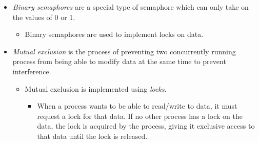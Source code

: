 \documentclass{article}
\begin{document}
\begin{itemize}
\begin{itemize}
\begin{itemize}
		\end{itemize}
		\item \texttt{down(s)}
		\begin{itemize}
			\item If $\mathtt{s} > 0$, the \texttt{s} is decremented, otherwise, the process calling \texttt{down(s)} is blocked.
		\end{itemize}
	\end{itemize}
	\item \emph{Binary semaphores} are a special type of semaphore which can only take on the values of 0 or 1.
	\begin{itemize}
		\item Binary semaphores are used to implement locks on data.
	\end{itemize}

	\item \emph{Mutual exclusion} is the process of preventing two concurrently running process from being able to modify data at the same time to prevent interference.
	\begin{itemize}
		\item Mutual exclusion is implemented using \emph{locks}.
		\begin{itemize}
			\item When a process wants to be able to read/write to data, it must request a lock for that data. If no other process has a lock on the data, the lock is acquired by the process, giving it exclusive access to that data until the lock is released.
		\end{itemize}
	\end{itemize}





















\end{itemize}

\ifdefined\iscombined
	\newpage
\else
	
\end{document}
